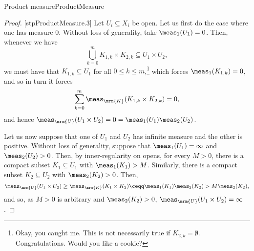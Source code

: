 \begin{thm}{Product measure}{ProductMeasure}
\begin{proof}
[stpProductMeasure.3]
Let $U_i\subseteq X_i$ be open.  Let us first do the case where one has measure $0$.  Without loss of generality, take $\meas _1(U_1)=0$.  Then, whenever we have
\begin{equation}
\bigcup _{k=0}^mK_{1,k}\times K_{2,k}\subseteq U_1\times U_2,
\end{equation}
we must have that $K_{1,k}\subseteq U_1$ for all $0\leq k\leq m$,\footnote{Okay, you caught me.  This is not necessarily true if $K_{2,k}=\emptyset$.  Congratulations.  Would you like a cookie?} which forces $\meas _1(K_{1,k})=0$, and so in turn it forces
\begin{equation}
\sum _{k=0}^m\meas _{\mrm{K}}(K_{1,k}\times K_{2,k})=0,
\end{equation}
and hence $\meas _{\mrm{U}}(U_1\times U_2)=0=\meas _1(U_1)\meas _2(U_2)$.

Let us now suppose that one of $U_1$ and $U_2$ has infinite measure and the other is positive.  Without loss of generality, suppose that $\meas _1(U_1)=\infty$ and $\meas _2(U_2)>0$.  Then, by inner-regularity on opens, for every $M>0$, there is a compact subset $K_1\subseteq U_1$ with $\meas _1(K_1)>M$.  Similarly, there is a compact subset $K_2\subseteq U_2$ with $\meas _2(K_2)>0$.  Then,
\begin{equation}
\meas _{\mrm{U}}(U_1\times U_2)\geq \meas _{\mrm{K}}(K_1\times K_2)\ceqq \meas _1(K_1)\meas _2(K_2)>M\meas _2(K_2),
\end{equation}
and so, as $M>0$ is arbitrary and $\meas _2(K_2)>0$, $\meas _{\mrm{U}}(U_1\times U_2)=\infty$.


\end{proof}
\end{thm}
